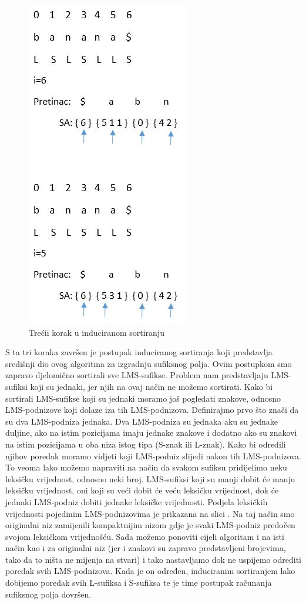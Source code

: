 \begin{figure}[H]
   \centering
       \includegraphics{./pictures/SAISstep3.jpg}
 \caption{Trećii korak u induciranom sortiranju}
 \label{fig:sais3}
\end{figure}

S ta tri koraka završen je postupak induciranog sortiranja koji predstavlja središnji dio ovog algoritma za izgradnju sufiksnog polja. Ovim postupkom smo zapravo djelomično sortirali sve LMS-sufikse. Problem nam predstavljaju LMS-sufiksi koji su jednaki, jer njih na ovaj način ne možemo sortirati. Kako bi sortirali LMS-sufikse koji su jednaki moramo još pogledati znakove, odnosno LMS-podnizove koji dolaze iza tih LMS-podnizova. Definirajmo prvo što znači da su dva LMS-podniza jednaka. Dva LMS-podniza su jednaka aku su jednake duljine, ako na istim pozicijama imaju jednake znakove i dodatno ako su znakovi na istim pozicijama u oba niza istog tipa (S-znak ili L-znak). Kako bi odredili njihov poredak moramo vidjeti koji LMS-podniz slijedi nakon tih LMS-podnizova. To veoma lako možemo napraviti na način da svakom sufiksu pridijelimo neku leksičku vrijednost, odnosno neki broj. LMS-sufiksi koji su manji dobit će manju leksičku vrijednost, oni koji su veći dobit će veću leksičku vrijednost, dok će jednaki LMS-podniz dobiti jednake leksičke vrijednosti. Podjela leksičkih vrijednosti pojedinim LMS-podnizovima je prikazana na slici . Na taj način smo originalni niz zamijenili kompaktnijim nizom gdje je svaki LMS-podniz predočen svojom leksičkom vrijednošću. Sada možemo ponoviti cijeli algoritam i na isti način kao i za originalni niz (jer i znakovi su zapravo predstavljeni brojevima, tako da to ništa ne mijenja na stvari) i tako nastavljamo dok ne uspijemo odrediti poredak svih LMS-podnizova. Kada je on određen, induciranim sortiranjem lako dobijemo poredak svih L-sufiksa i S-sufiksa te je time postupak računanja sufiksnog polja dovršen.

